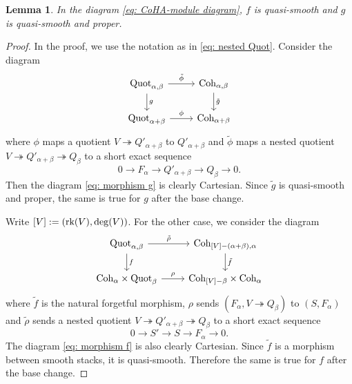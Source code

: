 \documentclass[10pt]{amsart}
\newcommand{\Quot}{\textnormal{Quot}}
\newcommand{\Coh}{\textnormal{Coh}}
\newcommand{\+}{{}^+}
\newcommand{\rk}{\textnormal{rk}}
\newtheorem {lemma}[theorem]{Lemma}
\theoremstyle{definition}
\theoremstyle {definition}
\theoremstyle {definition}
\begin{document}
\begin{lemma}\label{lem: quasi-smoothness}
    In the diagram \eqref{eq: CoHA-module diagram}, $f$ is quasi-smooth and $g$ is quasi-smooth and proper. 
\end{lemma}
\begin{proof}
    In the proof, we use the notation as in \eqref{eq: nested Quot}. Consider the diagram 
\begin{equation}\label{eq: morphism g}
    \begin{tikzcd}
\Quot_{\alpha,\beta} \arrow[r, "\tilde{\phi}"] \arrow[d, "g"] & \Coh_{\alpha,\beta} \arrow[d, "\tilde{g}"] \\
\Quot_{\alpha+\beta} \arrow[r, "\phi"]                 & \Coh_{\alpha+\beta}       
\end{tikzcd}
\end{equation}
    where $\phi$ maps a quotient $V\twoheadrightarrow Q'_{\alpha+\beta}$ to $Q'_{\alpha+\beta}$ and $\tilde{\phi}$ maps a nested quotient $V\twoheadrightarrow Q'_{\alpha+\beta}\twoheadrightarrow Q_\beta$ to a short exact sequence
    $$0\rightarrow F_\alpha\rightarrow Q'_{\alpha+\beta}\rightarrow Q_\beta\rightarrow 0.
    $$
    Then the diagram \eqref{eq: morphism g} is clearly Cartesian. Since $\tilde{g}$ is quasi-smooth and proper, the same is true for $g$ after the base change. 

    Write $[V]:=(\rk(V),\deg(V))$. For the other case, we consider the diagram
\begin{equation}\label{eq: morphism f}
    \begin{tikzcd}
\Quot_{\alpha,\beta} \arrow[r,"\tilde{\rho}"] \arrow[d, "f"] & \Coh_{[V]-(\alpha+\beta), \alpha} \arrow[d, "\tilde{f}"] \\
\Coh_\alpha\times \Quot_{\beta} \arrow[r, "\rho"]                 & \Coh_{[V]-\beta} \times \Coh_\alpha    
\end{tikzcd}
\end{equation}
where $\tilde{f}$ is the natural forgetful morphism, $\rho$ sends $(F_\alpha, V\twoheadrightarrow Q_\beta)$ to $(S,F_\alpha)$ and $\tilde{\rho}$ sends a nested quotient $V\twoheadrightarrow Q'_{\alpha+\beta}\twoheadrightarrow Q_\beta$ to a short exact sequence 
$$0\rightarrow S'\rightarrow S\rightarrow F_\alpha\rightarrow 0.$$
The diagram \eqref{eq: morphism f} is also clearly Cartesian. Since $\tilde f$ is a morphism between smooth stacks, it is quasi-smooth. Therefore the same is true for $f$ after the base change. 

\end{proof}
\end{document}
